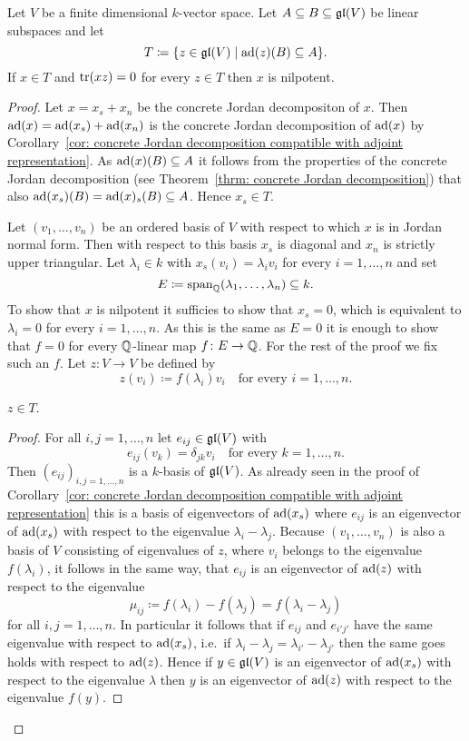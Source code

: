 \begin{lem}\label{lem: Cartan's criterion technical lemma}
 Let $V$ be a finite dimensional $k$-vector space. Let $A \subseteq B \subseteq \mathfrak{gl}(V)$ be linear subspaces and let
 \[
  T \coloneqq \{z \in \mathfrak{gl}(V) \mid \operatorname{ad}(z)(B) \subseteq A\}.
 \]
 If $x \in T$ and $\operatorname{tr}(xz) = 0$ for every $z \in T$ then $x$ is nilpotent.
\end{lem}
\begin{proof}
 Let $x = x_s + x_n$ be the concrete Jordan decompositon of $x$. Then $\operatorname{ad}(x) = \operatorname{ad}(x_s) + \operatorname{ad}(x_n)$ is the concrete Jordan decomposition of $\operatorname{ad}(x)$ by Corollary~\ref{cor: concrete Jordan decomposition compatible with adjoint representation}. As $\operatorname{ad}(x)(B) \subseteq A$ it follows from the properties of the concrete Jordan decomposition (see Theorem~\ref{thrm: concrete Jordan decomposition}) that also $\operatorname{ad}(x_s)(B) = \operatorname{ad}(x)_s(B) \subseteq A$. Hence $x_s \in T$.
 
 Let $(v_1, \dotsc, v_n)$ be an ordered basis of $V$ with respect to which $x$ is in Jordan normal form. Then with respect to this basis $x_s$ is diagonal and $x_n$ is strictly upper triangular. Let $\lambda_i \in k$ with $x_s(v_i) = \lambda_i v_i$ for every $i = 1, \dotsc, n$ and set
 \[
  E \coloneqq \operatorname{span}_{\mathbb{Q}}(\lambda_1, \dotsc, \lambda_n) \subseteq k.
 \]
 To show that $x$ is nilpotent it sufficies to show that $x_s = 0$, which is equivalent to $\lambda_i = 0$ for every $i = 1, \dotsc, n$. As this is the same as $E = 0$ it is enough to show that $f = 0$ for every $\mathbb{Q}$-linear map $f \colon E \to \mathbb{Q}$. For the rest of the proof we fix such an $f$. Let $z \colon V \to V$ be defined by
 \[
  z(v_i) \coloneqq f(\lambda_i) v_i \quad \text{for every $i = 1, \dotsc, n$}.
 \]
 
 \begin{claim*}
  $z \in T$.
 \end{claim*}
 \begin{proof}
  For all $i,j = 1, \dotsc, n$ let $e_{ij} \in \mathfrak{gl}(V)$ with
  \[
   e_{ij}(v_k) = \delta_{jk} v_i \quad \text{for every $k = 1, \dotsc, n$}.
  \]
  Then $(e_{ij})_{i,j = 1, \dotsc, n}$ is a $k$-basis of $\mathfrak{gl}(V)$. As already seen in the proof of Corollary~\ref{cor: concrete Jordan decomposition compatible with adjoint representation} this is a basis of eigenvectors of $\operatorname{ad}(x_s)$ where $e_{ij}$ is an eigenvector of $\operatorname{ad}(x_s)$ with respect to the eigenvalue $\lambda_i - \lambda_j$. Because $(v_1, \dotsc, v_n)$ is also a basis of $V$ consisting of eigenvalues of $z$, where $v_i$ belongs to the eigenvalue $f(\lambda_i)$, it follows in the same way, that $e_{ij}$ is an eigenvector of $\operatorname{ad}(z)$ with respect to the eigenvalue
  \[
   \mu_{ij} \coloneqq f(\lambda_i) - f(\lambda_j) = f(\lambda_i - \lambda_j)
  \]
  for all $i,j = 1, \dotsc, n$. In particular it follows that if $e_{ij}$ and $e_{i'j'}$ have the same eigenvalue with respect to $\operatorname{ad}(x_s)$, i.e.\ if $\lambda_i - \lambda_j = \lambda_{i'} - \lambda_{j'}$ then the same goes holds with respect to $\operatorname{ad}(z)$. Hence if $y \in \mathfrak{gl}(V)$ is an eigenvector of $\operatorname{ad}(x_s)$ with respect to the eigenvalue $\lambda$ then $y$ is an eigenvector of $\operatorname{ad}(z)$ with respect to the eigenvalue $f(y)$.
  

\end{proof}
\end{proof}
